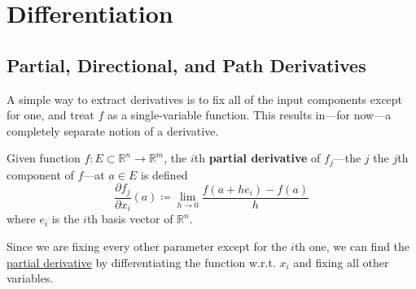 \section{Differentiation}

\subsection{Partial, Directional, and Path Derivatives} 

	A simple way to extract derivatives is to fix all of the input components except for one, and treat $f$ as a single-variable function. This results in---for now---a completely separate notion of a derivative. 

	\begin{definition}
	  \label{def:partial-derivative}
		Given function $f: E \subset \mathbb{R}^n \to \mathbb{R}^m$, the $i$th \textbf{partial derivative} of $f_j$---the $j$ the $j$th component of $f$---at $a \in E$ is defined 
		\begin{equation}
			\frac{\partial f_j}{\partial x_i}(a) \coloneqq \lim_{h \to 0} \frac{f(a + h e_i) - f(a)}{h} 
		\end{equation}
		where $e_i$ is the $i$th basis vector of $\mathbb{R}^n$. 
	\end{definition}

	Since we are fixing every other parameter except for the $i$th one, we can find the \hyperref[def:partial-derivative]{partial derivative} by differentiating the function w.r.t. $x_i$ and fixing all other variables. 

